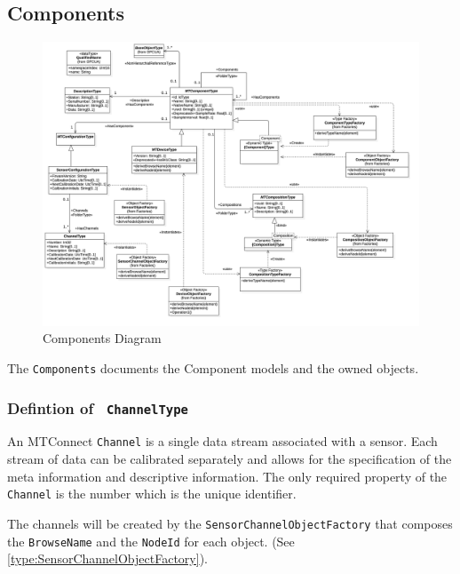 \subsection{Components}

\begin{figure}[ht]
  \centering
    \includegraphics[width=1.0\textwidth]{./diagrams/Components.png}
  \caption{Components Diagram}
  \label{fig:Components}
\end{figure}

\FloatBarrier


The \texttt{Components} documents the Component models and the owned objects.

\subsubsection{Defintion of \texttt{ ChannelType}} \label{type:ChannelType}

\FloatBarrier

An MTConnect \texttt{Channel} is a single data stream associated with a sensor. Each stream
of data can be calibrated separately and allows for the specification of the meta information
and descriptive information. The only required property of the \texttt{Channel} is the number
which is the unique identifier.

The channels will be created by the \texttt{SensorChannelObjectFactory} that composes the \texttt{BrowseName} 
and the \texttt{NodeId} for each object. (See \ref{type:SensorChannelObjectFactory}).


